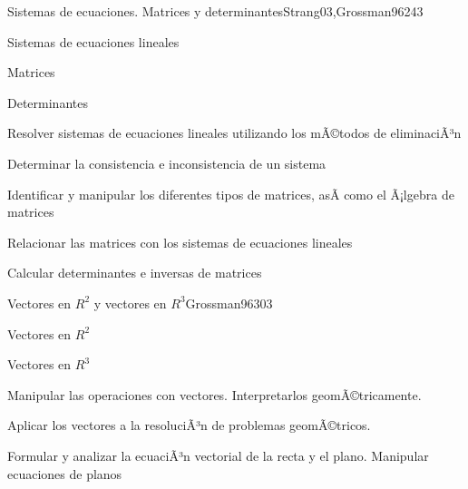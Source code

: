 \begin{syllabus}
\begin{unit}{Sistemas de ecuaciones. Matrices y determinantes}{Strang03,Grossman96}{24}{3}
   \begin{topics}
      \item Sistemas de ecuaciones lineales
      \item Matrices
      \item Determinantes
      \end{topics}

   \begin{unitgoals}
      \item Resolver sistemas de ecuaciones lineales utilizando los mÃ©todos de eliminaciÃ³n
      \item Determinar la consistencia e inconsistencia de un sistema
      \item Identificar y manipular los diferentes tipos de matrices, asÃ­ como el Ã¡lgebra de matrices
      \item Relacionar las matrices con los sistemas de ecuaciones lineales
      \item Calcular determinantes e inversas de matrices
   \end{unitgoals}
\end{unit}

\begin{unit}{Vectores en $R^2$ y vectores en $R^3$}{Grossman96}{30}{3}
   \begin{topics}
      \item Vectores en $R^2$
      \item Vectores en $R^3$
   \end{topics}

   \begin{unitgoals}
      \item Manipular las operaciones con vectores. Interpretarlos geomÃ©tricamente.
      \item Aplicar los vectores a la resoluciÃ³n de problemas geomÃ©tricos.
      \item Formular y analizar la ecuaciÃ³n vectorial de la recta y el plano. Manipular ecuaciones de planos
   \end{unitgoals}
\end{unit}



\begin{coursebibliography}
\end{coursebibliography}

\end{syllabus}
